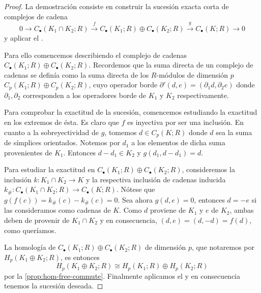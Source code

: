 \begin{proof}
	La demostración consiste en construir la sucesión exacta corta de complejos de
	cadena
	\[
	0 \to C_{\bullet}(K_{1}\cap K_{2};R) \overset{f}{\to}C_{\bullet}(K_{1};R) \oplus
	C_{\bullet}(K_{2};R) \overset{g}{\to}C_{\bullet}(K;R) \to 0
	\]
	y aplicar el .
	
	Para ello comencemos describiendo el complejo de cadenas
	$C_{\bullet}(K_{1};R) \oplus C_{\bullet}(K_{2};R)$. Recordemos que la suma directa
	de un complejo de cadenas se definía como la suma directa de los $R$-módulos de
	dimensión $p$ $C_{p}(K_{1};R) \oplus C_{p}(K_{2};R)$, cuyo operador borde
	$\partial'(d,e) = (\partial_{1}d, \partial_{2}e)$ donde
	$\partial_{1}, \partial_{2}$ corresponden a los operadores borde de $K_{1}$ y
	$K_{2}$ respectivamente.
	
	Para comprobar la exactitud de la sucesión, comencemos estudiando la exactitud
	en los extremos de ésta. Es claro que $f$ es inyectiva por ser una inclusión. En
	cuanto a la sobreyectividad de $g$, tomemos $d \in C_{p}(K;R)$ donde $d$ sea
	la suma de símplices orientados. Notemos por $d_{1}$ a los elementos de dicha suma
	provenientes de $K_{1}$. Entonces $d - d_{1}\in K_{2}$ y
	$g(d_{1}, d-d_{1}) = d$.
	
	Para estudiar la exactitud en
	$C_{\bullet}(K_{1};R) \oplus C_{\bullet}(K_{2};R)$, consideremos la inclusión $k
	: K_{1}\cap K_{2}\to K$ y la respectiva inclusión de cadenas inducida $k_{\#}:
	C_{\bullet}(K_{1}\cap K_{2};R) \to C_{\bullet}(K;R)$. Nótese que
	$g(f(c)) = k_{\#}(c) - k_{\#}(c) = 0$. Sea ahora $g(d,e) = 0$, entonces
	$d = -e$ si las consideramos como cadenas de $K$. Como $d$ proviene de $K_{1}$
	y $e$ de $K_{2}$, ambas deben de provenir de $K_{1}\cap K_{2}$ y en
	consecuencia, $(d,e) = (d,-d) = f(d)$, como queríamos.
	
	La homología de $C_{\bullet}(K_{1};R) \oplus C_{\bullet}(K_{2};R)$ de
	dimensión $p$, que notaremos por $H_{p}(K_{1}\oplus K_{2};R)$, es entonces
	\[
	H_{p}(K_{1}\oplus K_{2};R) \cong H_{p}(K_{1};R) \oplus H_{p}(K_{2};R)
	\]
	por la \autoref{prop:hom-free-commute}. Finalmente aplicamos el 
	y en consecuencia tenemos la sucesión deseada.
	

\end{proof}

